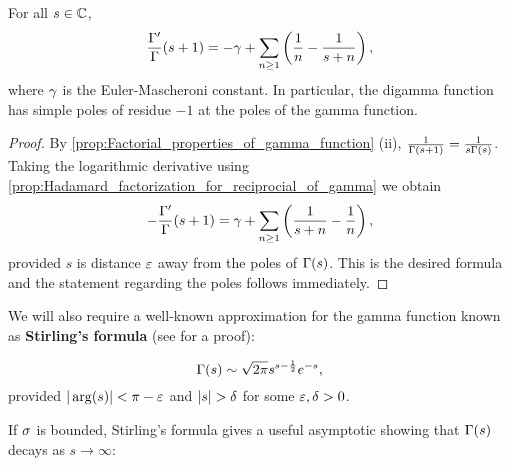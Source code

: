     \begin{corollary}\label{cor:logarithmic_derivative_of_gamma}
      For all $s \in \mathbb{C}$,
      \[
        \frac{\Gamma'}{\Gamma}(s+1) = -\gamma+\sum_{n \ge 1}\left(\frac{1}{n}-\frac{1}{s+n}\right),
      \]
      where $\gamma$ is the Euler-Mascheroni constant. In particular, the digamma function has simple poles of residue $-1$ at the poles of the gamma function.
    \end{corollary}
    \begin{proof}
      By \cref{prop:Factorial_properties_of_gamma_function} (ii), $\frac{1}{\Gamma(s+1)} = \frac{1}{s\Gamma(s)}$. Taking the logarithmic derivative using \cref{prop:Hadamard_factorization_for_reciprocial_of_gamma} we obtain
      \[
        -\frac{\Gamma'}{\Gamma}(s+1) = \gamma+\sum_{n \ge 1}\left(\frac{1}{s+n}-\frac{1}{n}\right),
      \]
      provided $s$ is distance $\varepsilon$ away from the poles of $\Gamma(s)$. This is the desired formula and the statement regarding the poles follows immediately.
    \end{proof}
    
    We will also require a well-known approximation for the gamma function known as \textbf{Stirling's formula} (see \cite{remmert1998classical} for a proof):

    \begin{theorem*}
      \phantom{}
      \[
        \Gamma(s) \sim \sqrt{2\pi}s^{s-\frac{1}{2}}e^{-s},
      \]
      provided $|\arg(s)| < \pi-\varepsilon$ and $|s| > \delta$ for some $\varepsilon,\delta > 0$.
    \end{theorem*}

    If $\sigma$ is bounded, Stirling's formula gives a useful asymptotic showing that $\Gamma(s)$ decays as $s \to \infty$:
    
